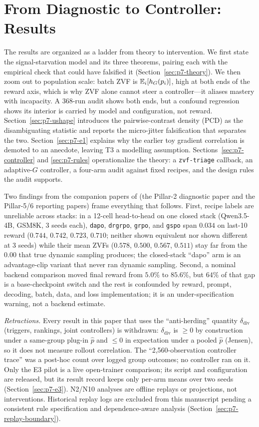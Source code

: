 \section{From Diagnostic to Controller: Results}
\label{sec:p7-results}
The results are organized as a ladder from theory to intervention. We first
state the signal-starvation model and its three theorems, pairing each with
the empirical check that could have falsified it
(Section~\ref{sec:p7-theory}). We then zoom out to population scale: batch
ZVF is $\mathbb{E}_i[h_G(p_i)]$, high at both ends of the reward axis, which is why ZVF
alone cannot steer a controller---it aliases mastery with incapacity. A
368-run audit shows both ends, but a confound regression shows its interior
is carried by model and configuration, not reward. Section~\ref{sec:p7-ushape} introduces the
pairwise-contrast density (PCD) as the disambiguating statistic and reports
the micro-jitter falsification that separates the two. Section~\ref{sec:p7-e1}
explains why the earlier toy gradient correlation is demoted to an anecdote,
leaving T3 a modelling assumption. Sections~\ref{sec:p7-controller} and \ref{sec:p7-rules}
operationalize the theory: a \texttt{zvf-triage} callback, an adaptive-$G$
controller, a four-arm audit against fixed recipes, and the design rules the
audit supports.

Two findings from the companion papers of \ours{} (the Pillar-2 diagnostic
paper and the Pillar-5/6 reporting papers) frame everything that follows.
First, recipe labels
are unreliable across stacks: in a 12-cell head-to-head on one closed stack
(Qwen3.5-4B, GSM8K, 3 seeds each), \texttt{dapo}, \texttt{drgrpo},
\texttt{grpo}, and \texttt{gspo} span $0.034$ on last-10 reward
($0.744$, $0.742$, $0.723$, $0.710$; neither shown equivalent nor shown
different at 3 seeds) while their mean ZVFs ($0.578$, $0.500$, $0.567$,
$0.511$) stay far from the $0.00$ that true dynamic sampling produces; the
closed-stack ``dapo'' arm is an advantage-clip variant that never ran dynamic
sampling. Second, a nominal backend comparison moved final reward from
$5.0\%$ to $85.6\%$, but $64\%$ of that gap is a base-checkpoint switch and
the rest is confounded by reward, prompt, decoding, batch, data, and loss
implementation; it is an under-specification warning, not a backend estimate.

\emph{Retractions.} Every result in this paper that uses the ``anti-herding''
quantity $\delta_{\mathrm{div}}$ (triggers, rankings, joint controllers) is
withdrawn: $\delta_{\mathrm{div}}$ is $\ge0$ by construction under a same-group
plug-in $\hat p$ and $\le0$ in expectation under a pooled $\hat p$ (Jensen), so it
does not measure rollout correlation. The ``2,560-observation controller
trace'' was a post-hoc count over logged group outcomes; no controller ran
on it.
Only the E3 pilot is a live open-trainer comparison; its script and
configuration are released, but its result record keeps only per-arm means
over two seeds (Section~\ref{sec:p7-e3}). N2/N10 analyses are offline replays
or projections, not interventions. Historical replay logs are excluded from
this manuscript pending a consistent rule specification and dependence-aware
analysis (Section~\ref{sec:p7-replay-boundary}).
